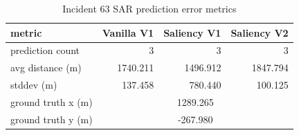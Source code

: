\begin{table}[ht]
\centering
\caption{Incident 63 SAR prediction error metrics}
\label{tab:sar-incident-63}
\begin{tabular}{lrrr}
\hline
metric & Vanilla V1 & Saliency V1 & Saliency V2 \\
\hline
prediction count & 3 & 3 & 3 \\
avg distance (m) & 1740.211 & 1496.912 & 1847.794 \\
stddev (m) & 137.458 & 780.440 & 100.125 \\
ground truth x (m) & \multicolumn{3}{c}{1289.265} \\
ground truth y (m) & \multicolumn{3}{c}{-267.980} \\
\hline
\end{tabular}
\end{table}
